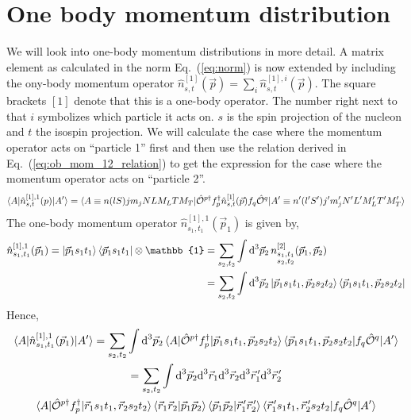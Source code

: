 \documentclass[10pt]{article}
\begin{document}
\section{One body momentum distribution}
\label{sec:ob_mom_distr_derivation}
We will look into one-body momentum distributions in more detail. A matrix 
element as calculated in the norm Eq.~(\ref{eq:norm}) is now extended by 
including the ony-body momentum operator $ \hat{n}_{s,t}^{[1]}(\vec{p}) = 
\sum_{i} \hat{n}_{s,t}^{[1],i}(\vec{p})$. The square brackets $[1]$ denote that 
this is a one-body operator. The number right next to that $i$ symbolizes which 
particle it acts on. $s$ is the spin projection of the nucleon and $t$ the 
isospin projection. We will calculate the case where the momentum operator acts 
on ``particle 1'' first and then use the relation derived in 
Eq.~(\ref{eq:ob_mom_12_relation}) to get the expression for the case where the 
momentum operator acts on ``particle 2''.
\begin{align*}
	\braket{A | \hat{n}_{s,t}^{[1],1}(p) | A'} = \braket { A \equiv n (l S) j m_j N L M_L T M_T | \hat{\mathcal{O}}^{p\dagger} f_{p}^{\dagger} \hat{n}_{s,t}^{[1]}(\vec{p}) f_{q} \hat{ \mathcal{O}}^{q} | A' \equiv n' (l' S') j' m_j' N' L' M_L' T' M_T' }
\end{align*}
The one-body momentum operator $\hat{n}_{s_1,t_1}^{[1],1}(\vec{p}_1)$ is given by,
\begin{align*}
	\hat{n}_{s_1,t_1}^{[1],1}(\vec{p}_1) = \ket{\vec{p}_1 s_1 t_1} \bra{\vec{p}_1 s_1 t_1} \otimes \mathbb{1} &= \sum_{s_2,t_2} \int \text{d}^{3} \vec{p}_{2} \, n_{ \substack{ s_1,t_1 \\ s_2,t_2} }^{[2]}(\vec{p}_1,\vec{p}_2)\\
	& = \sum_{s_2,t_2} \int \text{d}^{3} \vec{p}_{2} \ket{ \vec{p}_1 s_1 t_1, \vec{p}_2 s_2 t_2 } \bra { \vec{p}_1 s_1 t_1, \vec{p}_2 s_2 t_2}
\end{align*}
Hence,
\begin{multline*}
	\braket{ A | \hat{n}_{s_1,t_1}^{[1],1}(\vec{p}_1) | A'} = \sum_{s_2,t_2} \int \text{d}^{3} \vec{p}_{2} \braket{ A | \hat{\mathcal{O}}^{p\dagger} f_{p}^{\dagger} | \vec{p}_1 s_1 t_1, \vec{p}_2 s_2 t_2 } \braket{ \vec{p}_1 s_1 t_1, \vec{p}_2 s_2 t_2 | f_{q} \hat{ \mathcal{O}}^{q} | A'} \\
	=  \sum_{s_2,t_2} \int \text{d}^{3} \vec{p}_{2} \text{d}^{3} \vec{r}_{1} \text{d}^{3} \vec{r}_{2} \text{d}^{3} \vec{r}_{1}^{\, \prime} \text{d}^{3} \vec{r}_{2}^{\, \prime} \\
	 \braket{ A | \hat{\mathcal{O}}^{p\dagger} f_{p}^{\dagger} | \vec{r}_{1} s_1 t_1, \vec{r}_{2} s_2 t_2 } \braket{ \vec{r}_1 \vec{r}_2 | \vec{p}_1 \vec{p}_2 } \braket{ \vec{p}_1 \vec{p}_2 | \vec{r}_{1}^{\, \prime} \vec{r}_{2}^{\, \prime} } \braket{ \vec{r}_{1}^{\, \prime} s_1 t_1 , \vec{r}_{2}^{\, \prime} s_2 t_2 | f_{q} \hat{ \mathcal{O}}^{q} | A'}
\end{multline*}
\end{document}
